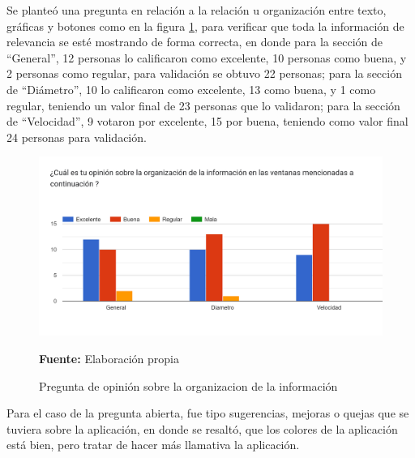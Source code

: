 \documentclass[12pt,twocolumn,a4paper]{article}
\begin{document}
Se planteó una pregunta en relación a la relación u organización entre texto, gráficas y botones como en la figura \ref{Encuesta8}, para verificar que toda la información de relevancia se esté mostrando de forma correcta, en donde para la sección de “General”, 12 personas lo calificaron como excelente, 10 personas como buena, y 2 personas como regular, para validación se obtuvo 22 personas; para la sección de “Diámetro”, 10 lo calificaron como excelente, 13 como  buena, y 1 como regular, teniendo un valor final de 23 personas que lo validaron; para la sección de “Velocidad”, 9 votaron por excelente, 15 por  buena, teniendo como valor final 24 personas para validación. 

\begin{figure}
	\centering
	\includegraphics[scale=0.2]{Encuesta8.png}
	\caption{Pregunta de opinión sobre la organizacion de la información } \textbf{Fuente:} Elaboración propia
	\label{Encuesta8}
\end{figure}

Para el caso de la pregunta abierta, fue tipo sugerencias, mejoras o quejas que se tuviera sobre la aplicación, en donde se resaltó, que los colores de la aplicación está bien, pero tratar de hacer más llamativa la aplicación.
\end{document}
